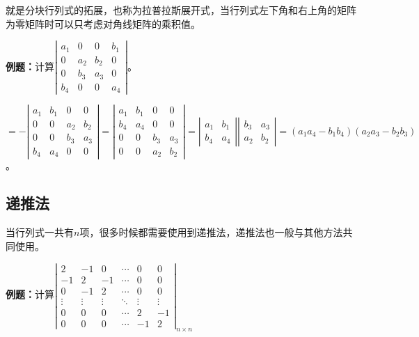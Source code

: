 \documentclass[UTF8, 12pt]{ctexart}
\begin{document}
就是分块行列式的拓展，也称为拉普拉斯展开式，当行列式左下角和右上角的矩阵为零矩阵时可以只考虑对角线矩阵的乘积值。

\textbf{例题：}计算$\left|\begin{array}{cccc} 
    a_1 & 0 & 0 & b_1 \\
    0 & a_2 & b_2 & 0 \\
    0 & b_3 & a_3 & 0 \\
    b_4 & 0 & 0 & a_4
\end{array}\right|$。

$=-\left|\begin{array}{cccc} 
    a_1 & b_1 & 0 & 0  \\
    0 & 0 & a_2 & b_2 \\
    0 & 0 & b_3 & a_3 \\
    b_4 & a_4 & 0 & 0
\end{array}\right|=\left|\begin{array}{cccc} 
    a_1 & b_1 & 0 & 0  \\
    b_4 & a_4 & 0 & 0 \\
    0 & 0 & b_3 & a_3 \\
    0 & 0 & a_2 & b_2
\end{array}\right|=\left|\begin{array}{cc} 
    a_1 & b_1 \\
    b_4 & a_4
\end{array}\right|\left|\begin{array}{cc}
    b_3 & a_3 \\
    a_2 & b_2
\end{array}\right|=(a_1a_4-b_1b_4)(a_2a_3-b_2b_3)$。

\subsection{递推法}

当行列式一共有$n$项，很多时候都需要使用到递推法，递推法也一般与其他方法共同使用。

\textbf{例题：}计算$\left|\begin{array}{cccccc} 
    2 & -1 & 0 & \cdots & 0 & 0  \\
    -1 & 2 & -1 & \cdots & 0 & 0 \\
    0 & -1 & 2 & \cdots & 0 & 0 \\
    \vdots & \vdots & \vdots & \ddots & \vdots & \vdots \\
    0 & 0 & 0 & \cdots & 2 & -1 \\
    0 & 0 & 0 & \cdots & -1 & 2
\end{array}\right|_{n\times n}$
\end{document}
